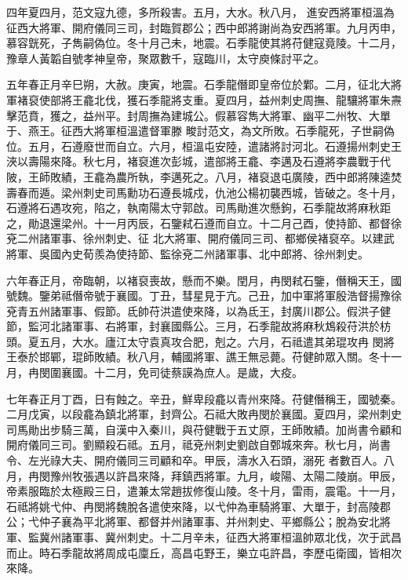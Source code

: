 \begin{pinyinscope}
 四年夏四月，范文寇九德，多所殺害。五月，大水。秋八月，
 進安西將軍桓溫為征西大將軍、開府儀同三司，封臨賀郡公；西中郎將謝尚為安西將軍。九月丙申，慕容皝死，子雋嗣偽位。冬十月己未，地震。石季龍使其將苻健寇竟陵。十二月，豫章人黃韜自號孝神皇帝，聚眾數千，寇臨川，太守庾條討平之。



 五年春正月辛巳朔，大赦。庚寅，地震。石季龍僭即皇帝位於鄴。二月，征北大將軍褚裒使部將王龕北伐，獲石季龍將支重。夏四月，益州刺史周撫、龍驤將軍朱燾擊范賁，獲之，益州平。封周撫為建城公。假慕容雋大將軍、幽平二州牧、大單于、燕王。征西大將軍桓溫遣督軍滕
 畯討范文，為文所敗。石季龍死，子世嗣偽位。五月，石遵廢世而自立。六月，桓溫屯安陸，遣諸將討河北。石遵揚州刺史王浹以壽陽來降。秋七月，褚裒進次彭城，遣部將王龕、李邁及石遵將李農戰于代陂，王師敗績，王龕為農所執，李邁死之。八月，褚裒退屯廣陵，西中郎將陳逵焚壽春而遁。梁州刺史司馬勳功石遵長城戍，仇池公楊初襲西城，皆破之。冬十月，石遵將石遇攻宛，陷之，執南陽太守郭啟。司馬勛進次懸鉤，石季龍故將麻秋距之，勛退還梁州。十一月丙辰，石鑒弒石遵而自立。十二月己酉，使持節、都督徐兗二州諸軍事、徐州刺史、征
 北大將軍、開府儀同三司、都鄉侯褚裒卒。以建武將軍、吳國內史荀羨為使持節、監徐兗二州諸軍事、北中郎將、徐州刺史。



 六年春正月，帝臨朝，以褚裒喪故，懸而不樂。閏月，冉閔弒石鑒，僭稱天王，國號魏。鑒弟祗僭帝號于襄國。丁丑，彗星見于亢。己丑，加中軍將軍殷浩督揚豫徐兗青五州諸軍事、假節。氐帥苻洪遣使來降，以為氐王，封廣川郡公。假洪子健節，監河北諸軍事、右將軍，封襄國縣公。三月，石季龍故將麻秋鴆殺苻洪於枋頭。夏五月，大水。廬江太守袁真攻合肥，剋之。六月，石祗遣其弟琨攻冉
 閔將王泰於邯鄲，琨師敗績。秋八月，輔國將軍、譙王無忌薨。苻健帥眾入關。冬十一月，冉閔圍襄國。十二月，免司徒蔡謨為庶人。是歲，大疫。



 七年春正月丁酉，日有蝕之。辛丑，鮮卑段龕以青州來降。苻健僭稱王，國號秦。二月戊寅，以段龕為鎮北將軍，封齊公。石祗大敗冉閔於襄國。夏四月，梁州刺史司馬勛出步騎三萬，自漢中入秦川，與苻健戰于五丈原，王師敗績。加尚書令顧和開府儀同三司。劉顯殺石祗。五月，祗兗州刺史劉啟自鄄城來奔。秋七月，尚書令、左光祿大夫、開府儀同三司顧和卒。甲辰，濤水入石頭，溺死
 者數百人。八月，冉閔豫州牧張遇以許昌來降，拜鎮西將軍。九月，峻陽、太陽二陵崩。甲辰，帝素服臨於太極殿三日，遣兼太常趙拔修復山陵。冬十月，雷雨，震電。十一月，石祗將姚弋仲、冉閔將魏脫各遣使來降，以弋仲為車騎將軍、大單于，封高陵郡公；弋仲子襄為平北將軍、都督并州諸軍事、并州刺史、平鄉縣公；脫為安北將軍、監冀州諸軍事、冀州刺史。十二月辛未，征西大將軍桓溫帥眾北伐，次于武昌而止。時石季龍故將周成屯廩丘，高昌屯野王，樂立屯許昌，李歷屯衛國，皆相次來降。




\end{pinyinscope}
